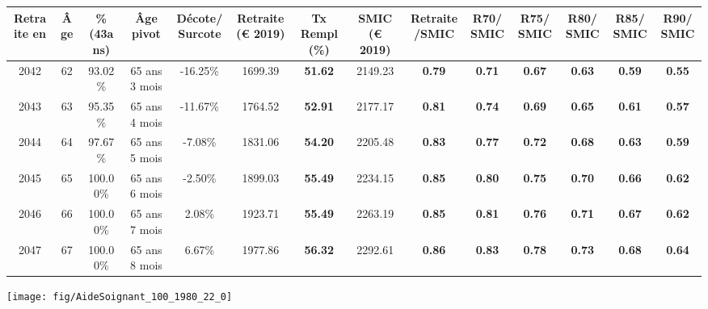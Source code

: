 \begin{adjustbox}{max width=\textwidth} 
\begin{tabular}[htb]{|c|c||c|c|c||c|c||c|c||c|c|c|c|c|} 
\hline 
 Retraite en &  Âge &  \%(43ans) &  Âge pivot &  Décote/Surcote &  Retraite (\euro{} 2019) &  Tx Rempl(\%) &  SMIC (\euro{} 2019) &  Retraite/SMIC &  R70/SMIC &  R75/SMIC &  R80/SMIC &  R85/SMIC &  R90/SMIC \\ 
\hline \hline 
 2042 &  62 &  93.02\% &  65 ans 3 mois &  -16.25\% &  1699.39 &  {\bf 51.62} &  2149.23 &  {\bf {\color{red} 0.79}} &  {\bf {\color{red} 0.71}} &  {\bf {\color{red} 0.67}} &  {\bf {\color{red} 0.63}} &  {\bf {\color{red} 0.59}} &  {\bf {\color{red} 0.55}} \\ 
\hline 
 2043 &  63 &  95.35\% &  65 ans 4 mois &  -11.67\% &  1764.52 &  {\bf 52.91} &  2177.17 &  {\bf {\color{red} 0.81}} &  {\bf {\color{red} 0.74}} &  {\bf {\color{red} 0.69}} &  {\bf {\color{red} 0.65}} &  {\bf {\color{red} 0.61}} &  {\bf {\color{red} 0.57}} \\ 
\hline 
 2044 &  64 &  97.67\% &  65 ans 5 mois &  -7.08\% &  1831.06 &  {\bf 54.20} &  2205.48 &  {\bf {\color{red} 0.83}} &  {\bf {\color{red} 0.77}} &  {\bf {\color{red} 0.72}} &  {\bf {\color{red} 0.68}} &  {\bf {\color{red} 0.63}} &  {\bf {\color{red} 0.59}} \\ 
\hline 
 2045 &  65 &  100.00\% &  65 ans 6 mois &  -2.50\% &  1899.03 &  {\bf 55.49} &  2234.15 &  {\bf {\color{red} 0.85}} &  {\bf {\color{red} 0.80}} &  {\bf {\color{red} 0.75}} &  {\bf {\color{red} 0.70}} &  {\bf {\color{red} 0.66}} &  {\bf {\color{red} 0.62}} \\ 
\hline 
 2046 &  66 &  100.00\% &  65 ans 7 mois &  2.08\% &  1923.71 &  {\bf 55.49} &  2263.19 &  {\bf {\color{red} 0.85}} &  {\bf {\color{red} 0.81}} &  {\bf {\color{red} 0.76}} &  {\bf {\color{red} 0.71}} &  {\bf {\color{red} 0.67}} &  {\bf {\color{red} 0.62}} \\ 
\hline 
 2047 &  67 &  100.00\% &  65 ans 8 mois &  6.67\% &  1977.86 &  {\bf 56.32} &  2292.61 &  {\bf {\color{red} 0.86}} &  {\bf {\color{red} 0.83}} &  {\bf {\color{red} 0.78}} &  {\bf {\color{red} 0.73}} &  {\bf {\color{red} 0.68}} &  {\bf {\color{red} 0.64}} \\ 
\hline 
\hline 
\end{tabular} 
\end{adjustbox} 
 
 \vspace{0.1cm} 

 {\hspace{-2.2cm}\texttt{[image: fig/AideSoignant\_100\_1980\_22\_0]}} 

